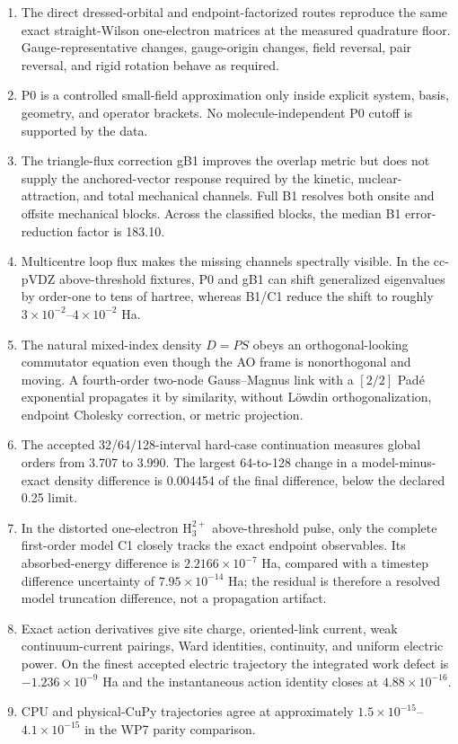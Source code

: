 \documentclass[11pt]{article}
\begin{document}
\begin{enumerate}
  \item The direct dressed-orbital and endpoint-factorized routes reproduce
  the same exact straight-Wilson one-electron matrices at the measured
  quadrature floor.  Gauge-representative changes, gauge-origin changes,
  field reversal, pair reversal, and rigid rotation behave as required.
  \item P0 is a controlled small-field approximation only inside explicit
  system, basis, geometry, and operator brackets.  No molecule-independent P0 cutoff
  is supported by the data.
  \item The triangle-flux correction gB1 improves the overlap metric but does
  not supply the anchored-vector response required by the kinetic,
  nuclear-attraction, and total mechanical channels.  Full B1 resolves both
  onsite and offsite mechanical blocks.  Across the classified blocks, the
  median B1 error-reduction factor is 183.10.
  \item Multicentre loop flux makes the missing channels spectrally visible.
  In the cc-pVDZ above-threshold fixtures, P0 and gB1 can shift generalized
  eigenvalues by order-one to tens of hartree, whereas B1/C1 reduce the shift
  to roughly $3\times10^{-2}$--$4\times10^{-2}$ Ha.
  \item The natural mixed-index density $D=PS$ obeys an orthogonal-looking
  commutator equation even though the AO frame is nonorthogonal and moving.
  A fourth-order two-node Gauss--Magnus link with a $[2/2]$ Pad\'e exponential
  propagates it by similarity, without L\"owdin orthogonalization, endpoint
  Cholesky correction, or metric projection.
  \item The accepted 32/64/128-interval hard-case continuation measures global
  orders from 3.707 to 3.990.  The largest 64-to-128 change in a
  model-minus-exact density difference is 0.004454 of the final difference,
  below the declared 0.25 limit.
  \item In the distorted one-electron $\mathrm{H}_3^{2+}$ above-threshold
  pulse, only the complete first-order model C1 closely tracks the exact
  endpoint observables.  Its absorbed-energy difference is
  $2.2166\times10^{-7}$ Ha, compared with a timestep difference uncertainty
  of $7.95\times10^{-14}$ Ha; the residual is therefore a resolved model
  truncation difference, not a propagation artifact.
  \item Exact action derivatives give site charge, oriented-link current,
  weak continuum-current pairings, Ward identities, continuity, and uniform
  electric power.  On the finest accepted electric trajectory the integrated
  work defect is $-1.236\times10^{-9}$ Ha and the instantaneous action identity
  closes at $4.88\times10^{-16}$.
  \item CPU and physical-CuPy trajectories agree at approximately
  $1.5\times10^{-15}$--$4.1\times10^{-15}$ in the WP7 parity comparison.
\end{enumerate}
\end{document}

